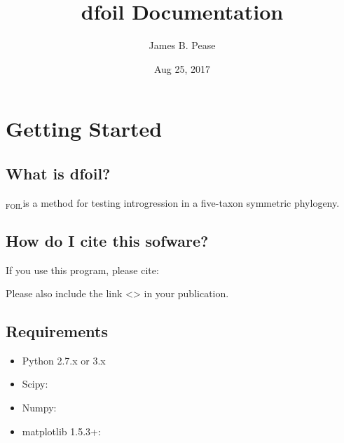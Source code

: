\documentclass[letterpaper,12pt,english]{sphinxmanual}
\title{dfoil Documentation}
\date{Aug 25, 2017}
\author{James B. Pease}
\begin{document}
\maketitle
\sphinxtableofcontents
{}\label{\detokenize{index::doc}}



\chapter{Getting Started}
\label{\detokenize{intro::doc}}\label{\detokenize{intro:welcome-to-dfoil-s-documentation}}\label{\detokenize{intro:getting-started}}

\section{What is dfoil?}
\label{\detokenize{intro:what-is-dfoil}}
$_{\text{FOIL}}$is a method for testing introgression in a five-taxon symmetric phylogeny.


\section{How do I cite this sofware?}
\label{\detokenize{intro:how-do-i-cite-this-sofware}}
If you use this program, please cite:


Please also include the link \textless{}\textgreater{} in your publication.


\section{Requirements}
\label{\detokenize{intro:requirements}}\begin{itemize}
\item {} 
Python 2.7.x or 3.x

\item {} 
Scipy: 

\item {} 
Numpy: 

\item {} 
matplotlib 1.5.3+: 

\end{itemize}
\end{document}
